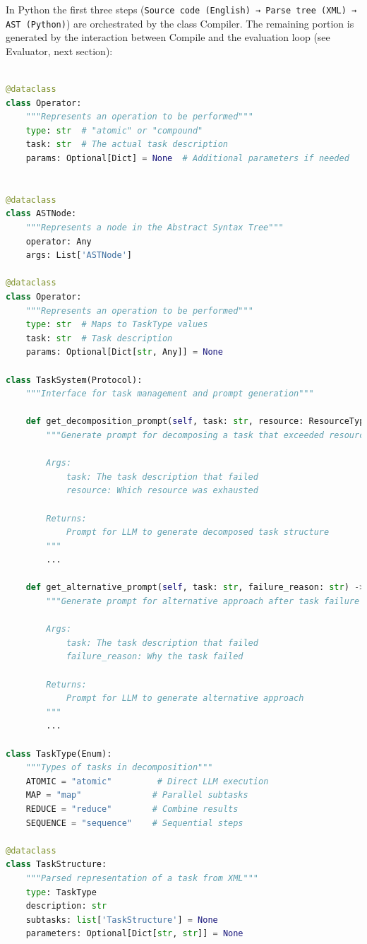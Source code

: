 \documentclass{article}
\begin{document}
In Python the first three steps (\verb|Source code (English) → Parse tree (XML) → AST (Python)|) are orchestrated by the class Compiler. The remaining portion is generated by the interaction between Compile and the evaluation loop (see Evaluator, next section):

\begin{lstlisting}[language=Python]

@dataclass
class Operator:
    """Represents an operation to be performed"""
    type: str  # "atomic" or "compound" 
    task: str  # The actual task description
    params: Optional[Dict] = None  # Additional parameters if needed


@dataclass
class ASTNode:
    """Represents a node in the Abstract Syntax Tree"""
    operator: Any
    args: List['ASTNode']

@dataclass
class Operator:
    """Represents an operation to be performed"""
    type: str  # Maps to TaskType values
    task: str  # Task description
    params: Optional[Dict[str, Any]] = None

class TaskSystem(Protocol):
    """Interface for task management and prompt generation"""
    
    def get_decomposition_prompt(self, task: str, resource: ResourceType) -> str:
        """Generate prompt for decomposing a task that exceeded resources
        
        Args:
            task: The task description that failed
            resource: Which resource was exhausted
            
        Returns:
            Prompt for LLM to generate decomposed task structure
        """
        ...
        
    def get_alternative_prompt(self, task: str, failure_reason: str) -> str:
        """Generate prompt for alternative approach after task failure
        
        Args:
            task: The task description that failed
            failure_reason: Why the task failed
            
        Returns:
            Prompt for LLM to generate alternative approach
        """
        ...

class TaskType(Enum):
    """Types of tasks in decomposition"""
    ATOMIC = "atomic"         # Direct LLM execution
    MAP = "map"              # Parallel subtasks
    REDUCE = "reduce"        # Combine results
    SEQUENCE = "sequence"    # Sequential steps

@dataclass
class TaskStructure:
    """Parsed representation of a task from XML"""
    type: TaskType
    description: str
    subtasks: list['TaskStructure'] = None
    parameters: Optional[Dict[str, str]] = None



\end{lstlisting}
\end{document}
